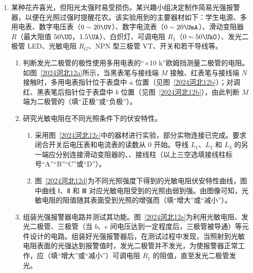 \documentclass[\gkver]{gaokaozhenti}
\begin{document}
\begin{enumerate}
{（2）为保证钢球每次平抛运动的初速度相同，必须让钢球在斜槽上同一位置静止释放，故高度相同；描点连线用平滑曲线连接，钢球做平抛运动的轨迹如图所示。


因为抛出点在坐标原点，为方便计算，在图线上找到较远的点，坐标为 $(14.1 \Ucm, 19.6 \Ucm)$ 的点为研究位置，根据平抛运动规律 $x = v_{0}t$，$y = \frac{1}{2}gt^{2}$

解得 $v_{0} = 0.71 \Ums$
}

\item
某种花卉喜光，但阳光太强时易受损伤。某兴趣小组决定制作简易光强报警器，以便在光照过强时提醒花农。该实验用到的主要器材如下：学生电源、多用电表、数字电压表（$0\sim20 \UV$）、数字电流表（$0\sim20 \UmA$）、滑动变阻器 $R$（最大阻值 $50 \UO$，$1.5 \UA$）、白炽灯、可调电阻 $R_{1}$（$0\sim50 \UkO$）、发光二极管 LED、光敏电阻 $R_{G}$、NPN 型三极管 VT、开关和若干导线等。
\begin{enumerate}
	\item
	判断发光二极管的极性使用多用电表的“$\times$10 k”欧姆挡测量二极管的电阻。如图~\ref{2024河北12a}所示，当黑表笔与接线端 $M$ 接触、红表笔与接线端 $N$ 接触时，多用电表指针位于表盘中 $a$ 位置（见图~\ref{2024河北12b}）；对调红、黑表笔后指针位于表盘中 $b$ 位置（见图~\ref{2024河北12b}），由此判断 $M$ 端为二极管的（填“正极”或“负极”）。
	\item
	研究光敏电阻在不同光照条件下的伏安特性。
	\begin{enumerate}
		\item
		采用图~\ref{2024河北12c}中的器材进行实验，部分实物连接已完成。要求闭合开关后电压表和电流表的读数从 0 开始。导线 $L_{1}$、$L_{2}$ 和 $L_{3}$ 的另一端应分别连接滑动变阻器的、、接线柱（以上三空选填接线柱标号“A”“B”“C”或“D”）。
		\item
		图~\ref{2024河北12d}为不同光照强度下得到的光敏电阻伏安特性曲线，图中曲线 Ⅰ、Ⅱ 和 Ⅲ 对应光敏电阻受到的光照由弱到强。由图像可知，光敏电阻的阻值随其表面受到光照的增强而（填“增大”或“减小”）。
	\end{enumerate}
	\item
	组装光强报警器电路并测试其功能。图~\ref{2024河北12e}为利用光敏电阻、发光二极管、三极管（当 $b$、$e$ 间电压达到一定程度后，三极管被导通）等元件设计的电路。组装好光强报警器后，在测试过程中发现，当照射到光敏电阻表面的光强达到报警值时，发光二极管并不发光，为使报警器正常工作，应（填“增大”或“减小”）可调电阻 $R_{1}$ 的阻值，直至发光二极管发光。
\end{enumerate}


\end{enumerate}
\end{document}
